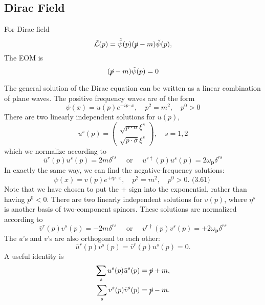 \subsection{Dirac Field}

For Dirac field
\begin{equation*}
	\tilde{\mathcal L}(p) = \tilde{\bar \psi}(p)(\cancel{p} - m)\tilde\psi(p),
\end{equation*}
The EOM is
\begin{equation}
	(\cancel p -m)\tilde\psi(p) = 0
\end{equation}

\begin{framedrmk}
The general solution of the Dirac equation can be written as a linear combination of plane waves. 
The positive frequency waves are of the form
\begin{equation*}
	\psi(x)=u(p) e^{-i p \cdot x}, \quad p^{2}=m^{2}, \quad p^{0}>0
\end{equation*}
There are two linearly independent solutions for $u(p)$,
\begin{equation*}
	u^{s}(p)=\left(\begin{array}{c}
	\sqrt{p \cdot \sigma} \xi^{s} \\
	\sqrt{p \cdot \bar{\sigma}} \xi^{s}
	\end{array}\right), \quad s=1,2
\end{equation*}
which we normalize according to
\begin{equation*}
	\bar{u}^{r}(p) u^{s}(p)=2 m \delta^{r s} \quad \text { or } \quad u^{r \dagger}(p) u^{s}(p)=2 \omega_{\bm p} \delta^{r s}
\end{equation*}
In exactly the same way, we can find the negative-frequency solutions:
\begin{equation*}
	\psi(x)=v(p) e^{+i p \cdot x}, \quad p^{2}=m^{2}, \quad p^{0}>0 \text {. (3.61) }
\end{equation*}
Note that we have chosen to put the $+$ sign into the exponential, rather than having $p^{0}<0$.
There are two linearly independent solutions for $v(p)$,
where $\eta^{s}$ is another basis of two-component spinors. These solutions are normalized according to
\begin{equation*}
	\bar{v}^{r}(p) v^{s}(p)=-2 m \delta^{r s} \quad \text { or } \quad v^{r \dagger}(p) v^{s}(p)=+2 \omega_{\bm{p}} \delta^{r s}
\end{equation*}
The $u$'s and $v$'s are also orthogonal to each other:
\begin{equation*}
	\bar{u}^{r}(p) v^{s}(p)=\bar{v}^{r}(p) u^{s}(p)=0.
\end{equation*}
A useful identity is
\begin{equation*}
\begin{aligned}
	\sum_{s} u^{s}(p) \bar{u}^{s}(p) &= \cancel p+m, \\
	\sum_{s} v^{s}(p) \bar{v}^{s}(p) &= \cancel p-m.
\end{aligned}
\end{equation*}
\end{framedrmk}

